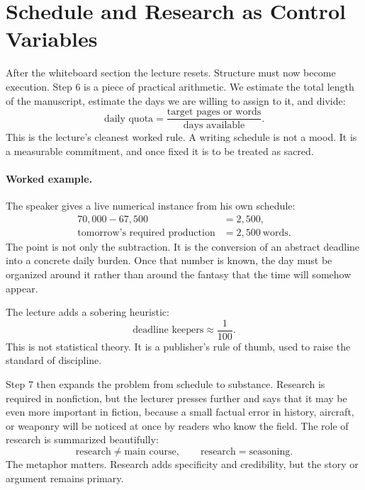 \section{Schedule and Research as Control Variables}

After the whiteboard section the lecture resets. Structure must now become execution. Step 6 is a piece of practical arithmetic. We estimate the total length of the manuscript, estimate the days we are willing to assign to it, and divide:
\begin{equation}
\text{daily quota} = \frac{\text{target pages or words}}{\text{days available}}.
\end{equation}
This is the lecture's cleanest worked rule. A writing schedule is not a mood. It is a measurable commitment, and once fixed it is to be treated as sacred.

\paragraph{Worked example.} The speaker gives a live numerical instance from his own schedule:
\begin{align}
70{,}000 - 67{,}500 &= 2{,}500,\\
\text{tomorrow's required production} &= 2{,}500\ \text{words}.
\end{align}
The point is not only the subtraction. It is the conversion of an abstract deadline into a concrete daily burden. Once that number is known, the day must be organized around it rather than around the fantasy that the time will somehow appear.

The lecture adds a sobering heuristic:
\begin{equation}
\text{deadline keepers} \approx \frac{1}{100}.
\end{equation}
This is not statistical theory. It is a publisher's rule of thumb, used to raise the standard of discipline.

Step 7 then expands the problem from schedule to substance. Research is required in nonfiction, but the lecturer presses further and says that it may be even more important in fiction, because a small factual error in history, aircraft, or weaponry will be noticed at once by readers who know the field. The role of research is summarized beautifully:
\begin{equation}
\text{research} \neq \text{main course}, \qquad
\text{research} = \text{seasoning}.
\end{equation}
The metaphor matters. Research adds specificity and credibility, but the story or argument remains primary.

